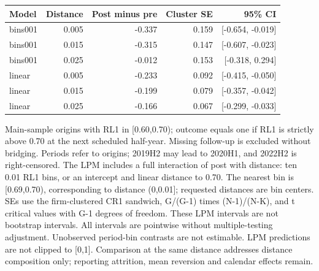 \begin{threeparttable}
\begin{tabular}{lrrrr}
\toprule
Model & Distance & Post minus pre & Cluster SE & 95\% CI \\
\midrule
bins001 & 0.005 & -0.337 & 0.159 & [-0.654, -0.019] \\
bins001 & 0.015 & -0.315 & 0.147 & [-0.607, -0.023] \\
bins001 & 0.025 & -0.012 & 0.153 & [-0.318, 0.294] \\
linear & 0.005 & -0.233 & 0.092 & [-0.415, -0.050] \\
linear & 0.015 & -0.199 & 0.079 & [-0.357, -0.042] \\
linear & 0.025 & -0.166 & 0.067 & [-0.299, -0.033] \\
\bottomrule
\end{tabular}
\begin{tablenotes}[flushleft]
\footnotesize
\item Main-sample origins with RL1 in [0.60,0.70); outcome equals one if RL1 is strictly above 0.70 at the next scheduled half-year. Missing follow-up is excluded without bridging. Periods refer to origins; 2019H2 may lead to 2020H1, and 2022H2 is right-censored. The LPM includes a full interaction of post with distance: ten 0.01 RL1 bins, or an intercept and linear distance to 0.70. The nearest bin is [0.69,0.70), corresponding to distance (0,0.01]; requested distances are bin centers. SEs use the firm-clustered CR1 sandwich, G/(G-1) times (N-1)/(N-K), and t critical values with G-1 degrees of freedom. These LPM intervals are not bootstrap intervals. All intervals are pointwise without multiple-testing adjustment. Unobserved period-bin contrasts are not estimable. LPM predictions are not clipped to [0,1]. Comparison at the same distance addresses distance composition only; reporting attrition, mean reversion and calendar effects remain.
\end{tablenotes}
\end{threeparttable}
